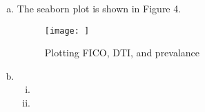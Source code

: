 \documentclass{article}
\begin{document}
\begin{enumerate}[(a)]
   \item The seaborn plot is shown in Figure 4. 
   
   \begin{figure}[h!]
    \centering
    \texttt{[image: ]}
    \caption{Plotting FICO, DTI, and prevalance}
    \label{fig:seabornplot}
    \end{figure}
   
   \item
   \begin{enumerate}[(i)]
       \item 
       
       \item 
   \end{enumerate}
 \end{enumerate}
\end{document}
